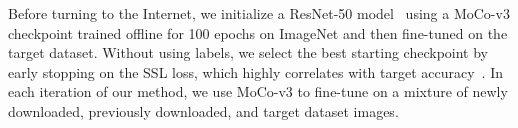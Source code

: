 Before turning to the Internet, we initialize a ResNet-50 model~\cite{he2016deep} using a MoCo-v3 checkpoint trained offline for 100 epochs on ImageNet and then fine-tuned on the target dataset. Without using labels, we select the best starting checkpoint by early stopping on the SSL loss, which highly correlates with target accuracy~\cite{li2022understanding}.
In each iteration of our method, we use MoCo-v3 to fine-tune on a mixture of newly downloaded, previously downloaded, and target dataset images.




